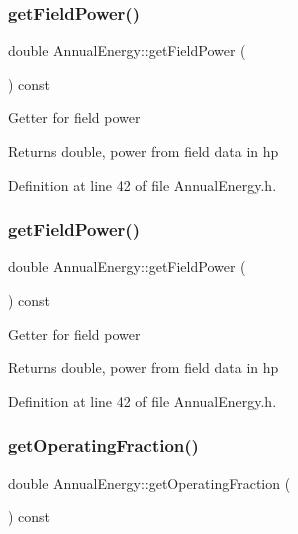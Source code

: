 \subsubsection{\texorpdfstring{get\+Field\+Power()}{getFieldPower()}\hspace{0.1cm}{\footnotesize\ttfamily [2/3]}}
{\footnotesize\ttfamily double Annual\+Energy\+::get\+Field\+Power (\begin{DoxyParamCaption}{ }\end{DoxyParamCaption}) const\hspace{0.3cm}{\ttfamily [inline]}}

Getter for field power \begin{DoxyReturn}{Returns}
double, power from field data in hp 
\end{DoxyReturn}


Definition at line 42 of file Annual\+Energy.\+h.

\mbox{\label{class_annual_energy_a52aa52274243f578ea7f92d27707cacb}} 
\subsubsection{\texorpdfstring{get\+Field\+Power()}{getFieldPower()}\hspace{0.1cm}{\footnotesize\ttfamily [3/3]}}
{\footnotesize\ttfamily double Annual\+Energy\+::get\+Field\+Power (\begin{DoxyParamCaption}{ }\end{DoxyParamCaption}) const\hspace{0.3cm}{\ttfamily [inline]}}

Getter for field power \begin{DoxyReturn}{Returns}
double, power from field data in hp 
\end{DoxyReturn}


Definition at line 42 of file Annual\+Energy.\+h.

\mbox{\label{class_annual_energy_a51c2bd68a5268ec9bafe3c70b3a7a6ad}} 
\subsubsection{\texorpdfstring{get\+Operating\+Fraction()}{getOperatingFraction()}\hspace{0.1cm}{\footnotesize\ttfamily [1/3]}}
{\footnotesize\ttfamily double Annual\+Energy\+::get\+Operating\+Fraction (\begin{DoxyParamCaption}{ }\end{DoxyParamCaption}) const\hspace{0.3cm}{\ttfamily [inline]}}


